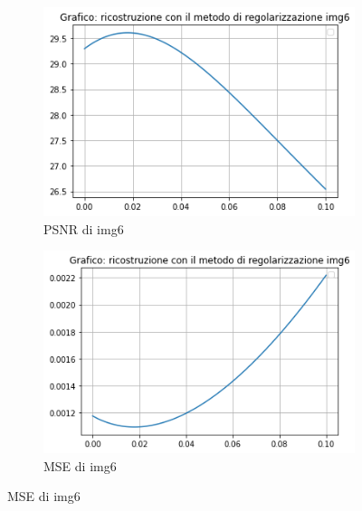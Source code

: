 \begin{figure}[H]
    \begin{subfigure}{0.5\textwidth}
        \centering
        \includegraphics[width=\textwidth]{output/PSNR/outputPSNR-img6.png}
        \caption{PSNR di img6}
        \label{fig:img6PSNR}
    \end{subfigure}\hfill
    \begin{subfigure}{0.5\textwidth}
        \centering
        \includegraphics[width=\textwidth]{output/MSE/outputMSE-img6.png}
        \caption{MSE di img6}
        \label{fig:img6MSE}
    \end{subfigure}
    

\end{figure}
